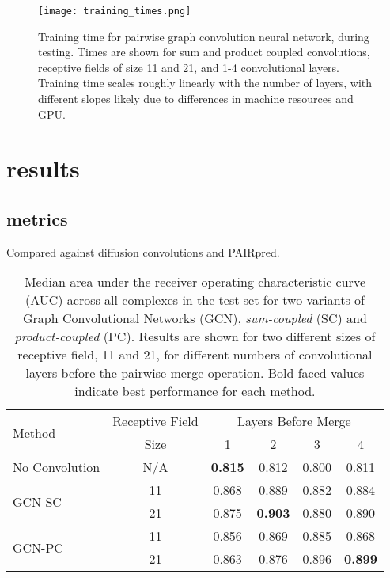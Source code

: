 \begin{figure}
	\texttt{[image: training\_times.png]}
	\caption{Training time for pairwise graph convolution neural network, during testing. Times are shown for sum and product coupled convolutions, receptive fields of size 11 and 21, and 1-4 convolutional layers. Training time scales roughly linearly with the number of layers, with different slopes likely due to differences in machine resources and GPU.
	\label{fig:train_times}}
\end{figure}


\section{results}
\subsection{metrics}

Compared against diffusion convolutions and PAIRpred.

\begin{table}
\begin{center}
	\begin{tabular}{lccccc}
		\toprule
		\multirow{2}{*}{Method} &
		Receptive Field & \multicolumn{4}{c}{Layers Before Merge} \\
		& Size & 1 & {2} & {3} & {4} \\
		\midrule
		No Convolution & N/A & \textbf{0.815} & 0.812 & 0.800 & 0.811  \\\cline{1-6}
		\multirow{2}{*}{GCN-SC} & 11 & 0.868 & 0.889 & 0.882 & 0.884 \\
		& 21 & 0.875 & \textbf{0.903} & 0.880 & 0.890 \\\cline{1-6}
		\multirow{2}{*}{GCN-PC} & 11 & 0.856 & 0.869 & 0.885 & 0.868 \\
		& 21 & 0.863 & 0.876 & 0.896 & \textbf{0.899} \\
		\bottomrule
	\end{tabular}
	\caption{\small Median area under the receiver operating characteristic curve (AUC) across all complexes in the test set for two variants of Graph Convolutional Networks (GCN), \textit{sum-coupled} (SC) and \textit{product-coupled} (PC). Results are shown for two different sizes of receptive field, 11 and 21, for different numbers of convolutional layers before the pairwise merge operation. Bold faced values indicate best performance for each method.}
	\label{tab:results}
\end{center}
\end{table}